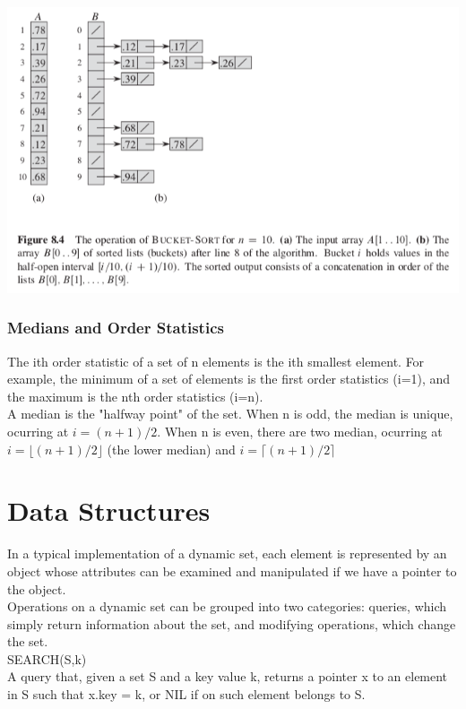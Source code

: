 \documentclass[11pt]{article}
\begin{document}
\includegraphics[width=.9\linewidth]{pics/c8_bucket_sort_fig.png} \\




\subsubsection{Medians and Order Statistics}
\label{sec-3-3-4}
The ith order statistic of a set of n elements is the ith smallest element. For example, the minimum of a set of elements is the first order statistics (i=1), and the maximum is the nth order statistics (i=n). \\
A median is the "halfway point" of the set. When n is odd, the median is unique, ocurring at $i=(n+1)/2$. When n is even, there are two median, ocurring at $i=\lfloor(n+1)/2\rfloor$ (the lower median) and $i=\lceil(n+1)/2\rceil$ \\


\section{Data Structures}
\label{sec-4}
In a typical implementation of a dynamic set, each element is represented by an object whose attributes can be examined and manipulated if we have a pointer to the object. \\

Operations on a dynamic set can be grouped into two categories: queries, which simply return information about the set, and modifying operations, which change the set. \\

SEARCH(S,k) \\
A query that, given a set S and a key value k, returns a pointer x to an element in S such that x.key = k, or NIL if on such element belongs to S. \\
\end{document}
